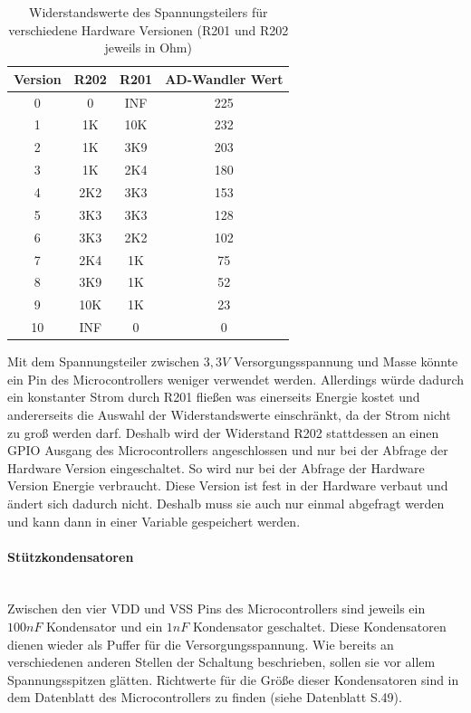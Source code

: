 \begin{table}[H]
    \centering
    \begin{tabular}{cccc}
        \toprule
        Version & R202 & R201 & AD-Wandler Wert \\
        \midrule
        0       & 0    & INF  & 225             \\
        1       & 1K   & 10K  & 232             \\
        2       & 1K   & 3K9  & 203             \\
        3       & 1K   & 2K4  & 180             \\
        4       & 2K2  & 3K3  & 153             \\
        5       & 3K3  & 3K3  & 128             \\
        6       & 3K3  & 2K2  & 102             \\
        7       & 2K4  & 1K   & 75              \\
        8       & 3K9  & 1K   & 52              \\
        9       & 10K  & 1K   & 23              \\
        10      & INF  & 0    & 0               \\
        \bottomrule
    \end{tabular}
    \caption{Widerstandswerte des Spannungsteilers für verschiedene Hardware Versionen (R201 und R202 jeweils in Ohm)}
    \label{tab:hardware_version}
\end{table}

Mit dem Spannungsteiler zwischen \(3,3V\) Versorgungsspannung und Masse könnte ein Pin des Microcontrollers weniger verwendet
werden. Allerdings würde dadurch ein konstanter Strom durch R201 fließen was einerseits Energie kostet und andererseits die
Auswahl der Widerstandswerte einschränkt, da der Strom nicht zu groß werden darf. Deshalb wird der Widerstand R202
stattdessen an einen \ac{GPIO} Ausgang des Microcontrollers angeschlossen und nur bei der Abfrage der Hardware Version
eingeschaltet. So wird nur bei der Abfrage der Hardware Version Energie verbraucht. Diese Version ist fest in der Hardware 
verbaut und ändert sich dadurch nicht. Deshalb muss sie auch nur einmal abgefragt werden und kann dann in einer Variable
gespeichert werden. 

\paragraph{Stützkondensatoren}\mbox{}\\
Zwischen den vier VDD und VSS Pins des Microcontrollers sind jeweils ein \(100nF\) Kondensator und ein \(1nF\) 
Kondensator geschaltet. Diese Kondensatoren dienen wieder als Puffer für die Versorgungsspannung.
Wie bereits an verschiedenen anderen Stellen der Schaltung beschrieben, sollen sie vor allem Spannungsspitzen glätten. 
Richtwerte für die Größe dieser Kondensatoren sind in dem Datenblatt des Microcontrollers zu finden
(siehe Datenblatt S.49\cite{stm32}).

